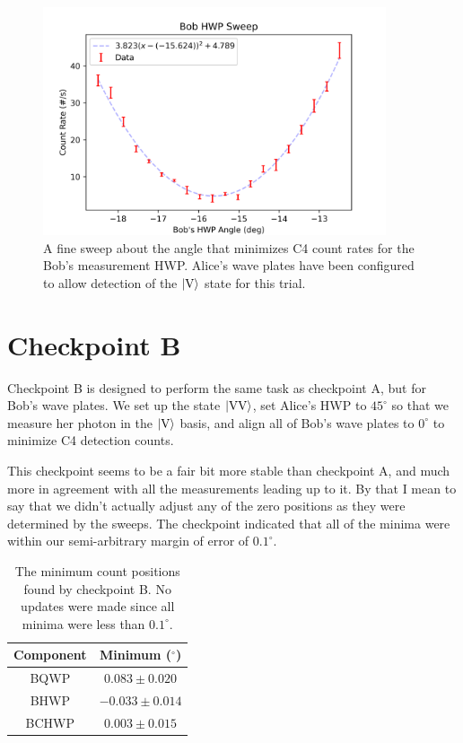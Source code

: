 \documentclass{paper}[11pt]
\begin{document}
	\begin{figure}[p]
		\centering
		\includegraphics[width=0.9\textwidth]{BHWP/BHWP_sweep2.png}
		\caption{A fine sweep about the angle that minimizes C4 count rates for the Bob's measurement HWP. Alice's wave plates have been configured to allow detection of the $\ket{\text{V}}$ state for this trial.}
		\label{fig:BHWP minimum fit}
	\end{figure}
	
	\section{Checkpoint B}
	Checkpoint B is designed to perform the same task as checkpoint A, but for Bob's wave plates. We set up the state $\ket{\text{VV}}$, set Alice's HWP to $45^\circ$ so that we measure her photon in the $\ket{\text{V}}$ basis, and align all of Bob's wave plates to $0^\circ$ to minimize C4 detection counts.
	
	This checkpoint seems to be a fair bit more stable than checkpoint A, and much more in agreement with all the measurements leading up to it. By that I mean to say that we didn't actually adjust any of the zero positions as they were determined by the sweeps. The checkpoint indicated that all of the minima were within our semi-arbitrary margin of error of $0.1^\circ$.
	\begin{table}[h]
		\centering
		\begin{tabular}{c||c}
			Component & Minimum (${}^\circ$) \\\hline
			BQWP & $0.083 \pm 0.020$ \\
			BHWP & $-0.033 \pm 0.014$ \\
			BCHWP & $0.003 \pm 0.015$
		\end{tabular}
		\caption{The minimum count positions found by checkpoint B. No updates were made since all minima were less than $0.1^\circ$.}
	\end{table}
	
\end{document}

